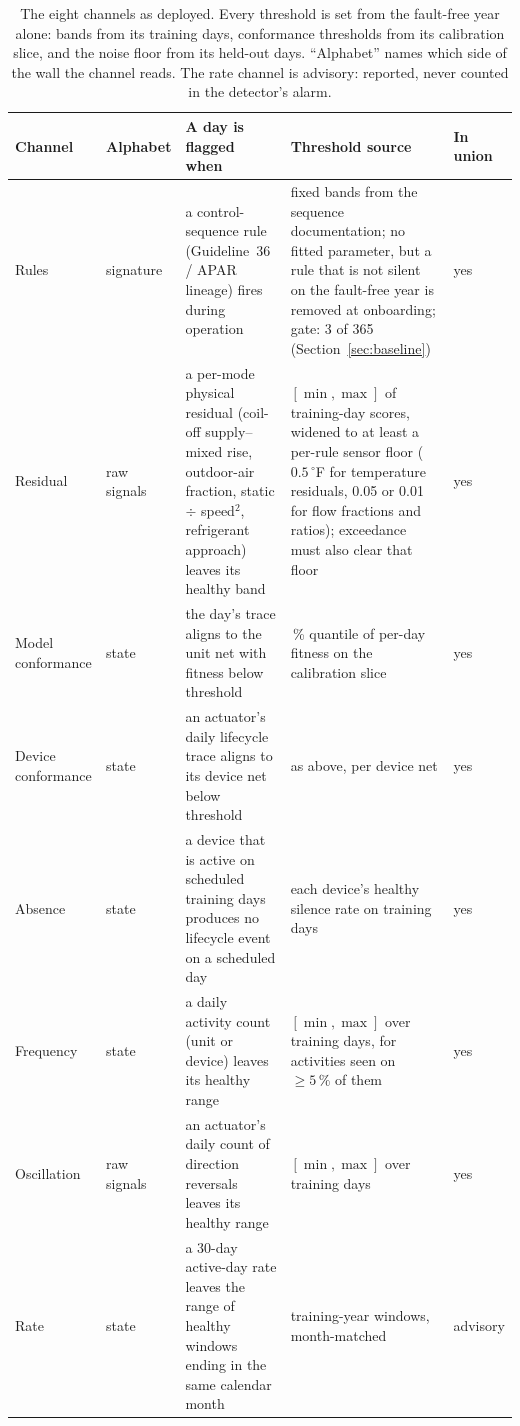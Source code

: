 \documentclass[11pt,letterpaper]{article}
\begin{document}
\begin{table}[htbp]
\centering
\caption{The eight channels as deployed. Every threshold is set from the fault-free year alone: bands from its training days, conformance thresholds from its calibration slice, and the noise floor from its held-out days. ``Alphabet'' names which side of the wall the channel reads. The rate channel is advisory: reported, never counted in the detector's alarm.}
\label{tab:channels}
\small\setlength{\tabcolsep}{4pt}
\begin{tabular}{@{}>{\raggedright\arraybackslash}p{1.9cm}>{\raggedright\arraybackslash}p{1.45cm}>{\raggedright\arraybackslash}p{4.35cm}>{\raggedright\arraybackslash}p{4.35cm}>{\raggedright\arraybackslash}p{1.25cm}@{}}
\hline
Channel & Alphabet & A day is flagged when & Threshold source & In union \\
\hline
Rules & signature & a control-sequence rule (Guideline~36 / APAR lineage) fires during operation & fixed bands from the sequence documentation; no fitted parameter, but a rule that is not silent on the fault-free year is removed at onboarding; gate: 3 of 365 (Section~\ref{sec:baseline}) & yes \\
Residual & raw signals & a per-mode physical residual (coil-off supply--mixed rise, outdoor-air fraction, static $\div$ speed$^2$, refrigerant approach) leaves its healthy band & $[\min,\max]$ of training-day scores, widened to at least a per-rule sensor floor ($0.5\,^\circ$F for temperature residuals, 0.05 or 0.01 for flow fractions and ratios); exceedance must also clear that floor & yes \\
Model conformance & state & the day's trace aligns to the unit net with fitness below threshold & 1\,\% quantile of per-day fitness on the calibration slice & yes \\
Device conformance & state & an actuator's daily lifecycle trace aligns to its device net below threshold & as above, per device net & yes \\
Absence & state & a device that is active on scheduled training days produces no lifecycle event on a scheduled day & each device's healthy silence rate on training days & yes \\
Frequency & state & a daily activity count (unit or device) leaves its healthy range & $[\min,\max]$ over training days, for activities seen on $\geq 5\,\%$ of them & yes \\
Oscillation & raw signals & an actuator's daily count of direction reversals leaves its healthy range & $[\min,\max]$ over training days & yes \\
Rate & state & a 30-day active-day rate leaves the range of healthy windows ending in the same calendar month & training-year windows, month-matched & advisory \\
\hline
\end{tabular}
\end{table}
\end{document}
